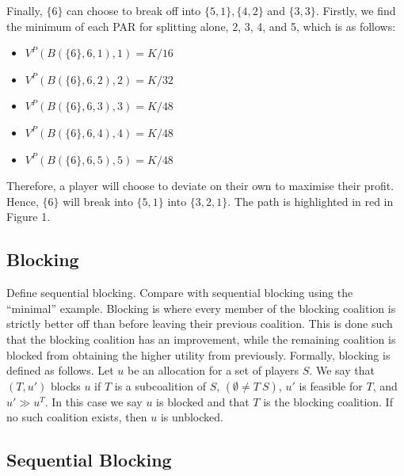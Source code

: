 \documentclass[sigconf,anonymous]{aamas}
\newcommand{\ykc}[1]{{\color{blue} #1}}
\begin{document}
Finally, $\{6\}$ can choose to break off into $\{5, 1\}, \{4, 2\}$ and $\{3, 3\}$. Firstly, we find the minimum of each PAR for splitting alone, 2, 3, 4, and 5, which is as follows: 
\begin{itemize}
	\item $V^P(B(\{6\}, 6, 1), 1) = K/16$
	\item $V^P(B(\{6\}, 6, 2), 2) = K/32$ 
	\item $V^P(B(\{6\}, 6, 3), 3) = K/48$
	\item $V^P(B(\{6\}, 6, 4), 4) = K/48$
	\item $V^P(B(\{6\}, 6, 5), 5) = K/48$
\end{itemize}
Therefore, a player will choose to deviate on their own to maximise their profit. Hence, $\{6\}$ will break into $\{5, 1\}$ into $\{3, 2, 1\}$. The path is highlighted in red in Figure 1. 

\subsection{Blocking}

\ykc{Define sequential blocking. Compare with sequential blocking using the ``minimal'' example.}
Blocking is where every member of the blocking coalition is strictly better off than before leaving their previous coalition. This is done such that the blocking coalition has an improvement, while the remaining coalition is blocked from obtaining the higher utility from previously. Formally, blocking is defined as follows. Let $u$ be an allocation for a set of players $S$. We say that $(T, u')$ blocks $u$ if $T$ is a subcoalition of $S$, $(\emptyset \neq T \ S)$, $u'$ is feasible for $T$, and $u' \gg u^T$. In this case we say $u$ is blocked and that $T$ is the blocking coalition. If no such coalition exists, then $u$ is unblocked.  

\subsection{Sequential Blocking} 
\end{document}
